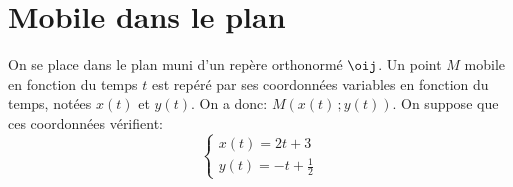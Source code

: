 \documentclass[a4paper]{article}
\begin{document}
\cfoot{} \lfoot{}
\section{Mobile dans le plan}
On se place dans le plan muni d'un rep\`ere orthonorm\'e $\oij$. Un
point $M$ mobile en fonction du temps $t$  est rep\'er\'e par ses
coordonn\'ees variables en fonction du temps, not\'ees $x(t)$ et
$y(t)$. On a donc: $M\left( x(t)\,;y(t)\right)$. On suppose que ces
coordonn\'ees v\'erifient:
\begin{equation}
  \label{eq:para}
  \left\{
\begin{array}{ll}
x(t)=2t+3\\
y(t)=-t+\frac12
\end{array}
\right.
\end{equation}
\end{document}
